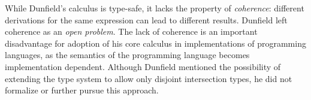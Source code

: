 

While Dunfield's calculus is type-safe, it lacks the property of
\emph{coherence}: different derivations for the same expression can
lead to different results. Dunfield left coherence as
an \emph{open problem}. The lack of coherence is an important
disadvantage for adoption of his core calculus in implementations of
programming languages, as the semantics of the programming language
becomes implementation dependent. Although Dunfield mentioned the
possibility of extending the type system to allow only disjoint
intersection types, he did not formalize or further pursue this
approach. 


\begin{comment}
Moreover, from the theoretic point-of-view, the ambiguity that arises
from the lack of coherence makes the calculus unsatisfying when the
goal is to precisely capture the essence of solutions to
extensibility.
\end{comment}

